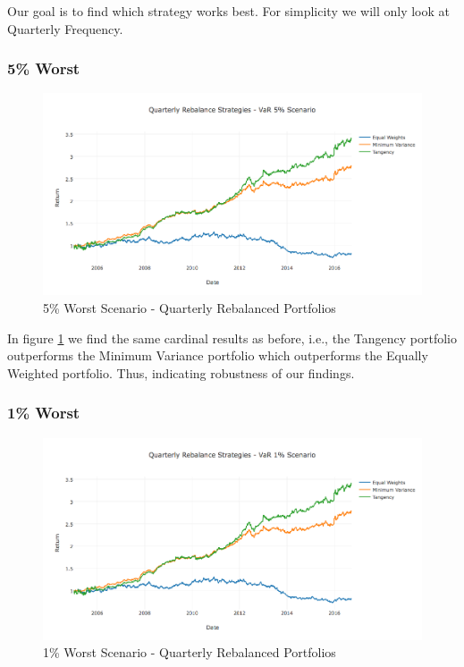 \documentclass[paper=a4, fontsize=11pt]{scrartcl} %
\numberwithin{equation}{section} %
\numberwithin{figure}{section} %
\numberwithin{table}{section} %
\begin{document}
Our goal is to find which strategy works best. For simplicity we will only look at Quarterly Frequency.

\subsubsection{5\% Worst}

\begin{figure}[H]
  \includegraphics[width=\linewidth]{Q5.png}
  \caption{5\% Worst Scenario - Quarterly Rebalanced Portfolios}
  \label{fig:Q5}
\end{figure}

In figure \ref{fig:Q5} we find the same cardinal results as before, i.e., the Tangency portfolio outperforms the Minimum Variance portfolio which outperforms the Equally Weighted portfolio. Thus, indicating robustness of our findings.

\subsubsection{1\% Worst}

\begin{figure}[H]
  \includegraphics[width=\linewidth]{Q1.png}
  \caption{1\% Worst Scenario - Quarterly Rebalanced Portfolios}
  \label{fig:Q1}
\end{figure}
\end{document}
